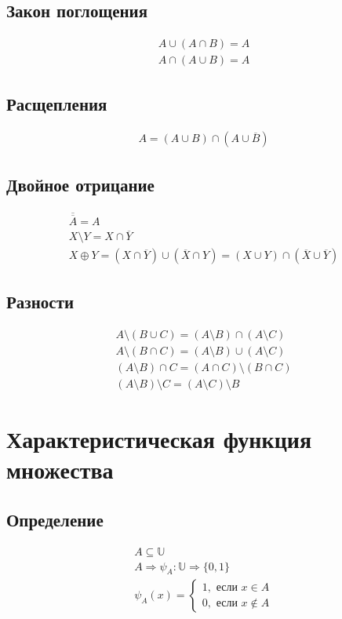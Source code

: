 \documentclass{article}
\begin{document}
\subsection{Закон поглощения}
\begin{gather*}
    A \cup (A \cap B) = A \\
    A \cap (A \cup B) = A
\end{gather*}


\subsection{Расщепления}
\begin{gather*}
    A = (A \cup B) \cap (A \cup \overline{B})
\end{gather*}


\subsection{Двойное отрицание}
\begin{gather*}
    \overline{\overline{A}} = A \\
    X \setminus Y = X \cap \overline{Y} \\
    X \oplus Y = (X \cap \overline{Y}) \cup (\overline{X} \cap Y) = (X \cup Y) \cap (\overline{X} \cup \overline{Y})
\end{gather*}


\subsection{Разности}
\begin{gather*}
    A \setminus (B \cup C) = (A \setminus B) \cap (A \setminus C) \\
    A \setminus (B \cap C) = (A \setminus B) \cup (A \setminus C) \\ 
    (A \setminus B) \cap C = (A \cap C) \setminus (B \cap C) \\
    (A \setminus B) \setminus C = (A \setminus C) \setminus B
\end{gather*}



\section{Характеристическая функция множества}

\subsection{Определение}
\begin{gather*}
    A \subseteq \mathbb{U} \\
    A \Rightarrow \psi_A: \mathbb{U} \Rightarrow \{0, 1\} \\
    \psi_A(x) = 
    \begin{cases}
        1, \text{ если } x \in A \\
        0, \text{ если } x \notin A
    \end{cases}
\end{gather*}
\end{document}
